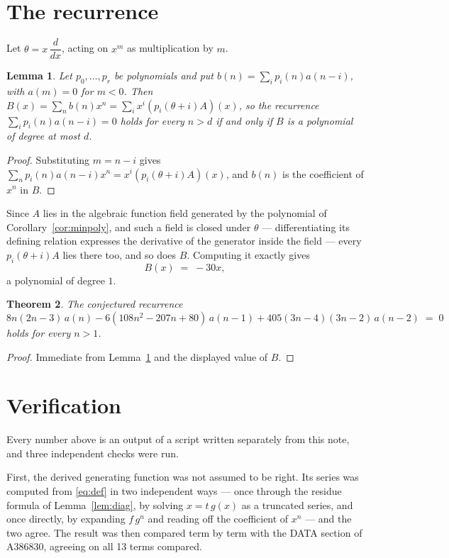 \documentclass[11pt,a4paper]{article}
\theoremstyle{plain}
\newtheorem{theorem}{Theorem}
\newtheorem{lemma}[theorem]{Lemma}
\theoremstyle{definition}
\begin{document}
\section{The recurrence}

Let $\theta=x\,\dfrac{d}{dx}$, acting on $x^{m}$ as multiplication by $m$.

\begin{lemma}\label{lem:transfer}
Let $p_{0},\dots,p_{r}$ be polynomials and put $b(n)=\sum_{i}p_{i}(n)a(n-i)$, with
$a(m)=0$ for $m<0$. Then $B(x)=\sum_{n}b(n)x^{n}=\sum_{i}x^{i}(p_{i}(\theta+i)A)(x)$, so
the recurrence $\sum_{i}p_{i}(n)a(n-i)=0$ holds for every $n>d$ if and only if $B$ is a
polynomial of degree at most $d$.
\end{lemma}

\begin{proof}
Substituting $m=n-i$ gives $\sum_{n}p_{i}(n)a(n-i)x^{n}=x^{i}(p_{i}(\theta+i)A)(x)$, and
$b(n)$ is the coefficient of $x^{n}$ in $B$.
\end{proof}

Since $A$ lies in the algebraic function field generated by the polynomial of
Corollary~\ref{cor:minpoly}, and such a field is closed under $\theta$ --- differentiating
its defining relation expresses the derivative of the generator inside the field ---
every $p_{i}(\theta+i)A$ lies there too, and so does $B$. Computing it exactly gives
\[
B(x)\;=\;- 30 x ,
\]
a polynomial of degree $1$.

\begin{theorem}
The conjectured recurrence
\[
8 n \left(2 n - 3\right)\,a(n) -  6 \left(108 n^{2} - 207 n + 80\right)\,a(n-1) + 405 \left(3 n - 4\right) \left(3 n - 2\right)\,a(n-2) \;=\;0
\]
holds for every $n>1$.
\end{theorem}

\begin{proof}
Immediate from Lemma~\ref{lem:transfer} and the displayed value of $B$.
\end{proof}

\section{Verification}

Every number above is an output of a script written separately from this note, and three
independent checks were run.

First, the derived generating function was not assumed to be right. Its series was
computed from \eqref{eq:def} in two independent ways --- once through the residue formula
of Lemma~\ref{lem:diag}, by solving $x=t\,g(x)$ as a truncated series, and once directly,
by expanding $f\,g^{n}$ and reading off the coefficient of $x^{n}$ --- and the two agree.
The result was then compared term by term with the DATA section of A386830, agreeing on
all 13 terms compared.
\end{document}

